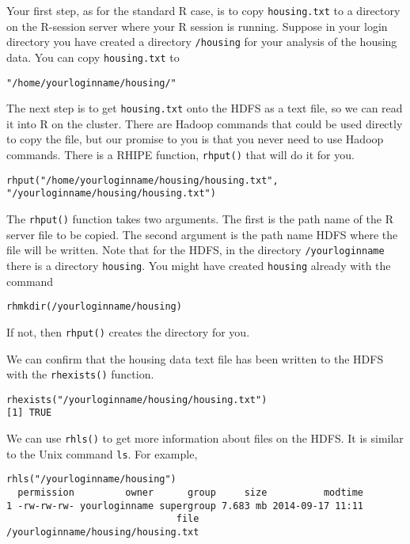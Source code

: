 Your first step, as for the standard R case, is to copy \texttt{housing.txt} to a
directory on the R-session server where your R session is running.
Suppose in your login directory you have created a directory \texttt{/housing}
for your analysis of the housing data. You can copy \texttt{housing.txt} to

\begin{verbatim}
"/home/yourloginname/housing/"
\end{verbatim}

The next step is to get \texttt{housing.txt} onto the HDFS as a text file, so we can
read it into R on the cluster. There are Hadoop commands that could be used
directly to copy the file, but our promise to you is that you never need to
use Hadoop commands. There is a RHIPE function, \texttt{rhput()} that will do it
for you.

\begin{verbatim}
rhput("/home/yourloginname/housing/housing.txt", "/yourloginname/housing/housing.txt")
\end{verbatim}


The \texttt{rhput()} function takes two arguments.
The first is the path name of the R server file to be copied. The second
argument is the path name HDFS where the file will be written.
Note that for the HDFS, in the  directory \texttt{/yourloginname}
there is a directory \texttt{housing}. You might have created \texttt{housing}
already with the command

\begin{verbatim}
rhmkdir(/yourloginname/housing)
\end{verbatim}

If not, then \texttt{rhput()} creates the directory for you.

We can confirm that the housing data text file has been written to the HDFS
with the \texttt{rhexists()} function.

\begin{verbatim}
rhexists("/yourloginname/housing/housing.txt")
[1] TRUE
\end{verbatim}

We can use \texttt{rhls()} to get more information about files on the
HDFS. It is similar to the Unix command \texttt{ls}. For example,

\begin{verbatim}
rhls("/yourloginname/housing")
  permission         owner      group     size          modtime
1 -rw-rw-rw- yourloginname supergroup 7.683 mb 2014-09-17 11:11
                              file
/yourloginname/housing/housing.txt
\end{verbatim}

